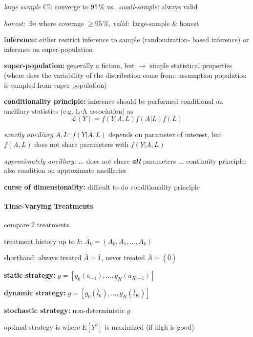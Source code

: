 \documentclass[8pt,twoside]{extarticle}
\begin{document}
\begin{multicols}{2}
 \textit{large sample} CI: converge to 95\,\% vs.\ \textit{small-sample:} always valid



 \textit{honest:}\ $\exists n$ where coverage $\geq 95\,\%$,
\textit{valid:}\ large-sample \& honest

 \textbf{inference:} either
restrict inference to sample (randomization- based inference) or inference on super-population


 \textbf{super-population:} generally a fiction, but $\to$ simple statistical properties (where does the variability of the distribution come from: 
assumption population is sampled from super-population)

 \textbf{conditionality principle:} inference should be performed conditional on ancillary statistics (e.g. L-A association) as $$\mathcal{L}(Y)=f(Y|A, L)f(A|L)f(L)$$

\textit{exactly ancillary} $A,L$: $f(Y|A, L)$ depends on parameter of interest, but $f(A,L)$ does not share parameters with $f(Y|A, L)$


\textit{approximately ancillary:}  ... does not share \textit{\textbf{all}} parameters ... 
continuity principle: also condition on approximate ancillaries

 \textbf{curse of dimensionality:} difficult to do conditionality principle


\vspace{1.5em}

 \colorbox{lightgray!20!white}{\begin{minipage}{28em}



\paragraph{Time-Varying Treatments} compare 2 treatments

 treatment history up to $k$: $\bar{A}_k=(A_0, A_1, ..., A_k)$

 shorthand: always treated $\bar{A} = \bar{1}$, never treated $\bar{A} = \left(\bar{0}\right)$

 \textbf{static strategy:} $g=\left[g_0(\bar{a}_{-1}), ..., g_K(\bar{a}_{K-1})\right]$

 \textbf{dynamic strategy:} $g=\left[g_0(\bar{l}_0), ..., g_K(\bar{l}_K)\right]$

 \textbf{stochastic strategy:} non-deterministic $g$


 optimal strategy is where $\mathrm{E}\left[Y^g\right]$ is maximized (if high is good)


\end{minipage}}
\end{multicols}
\end{document}
